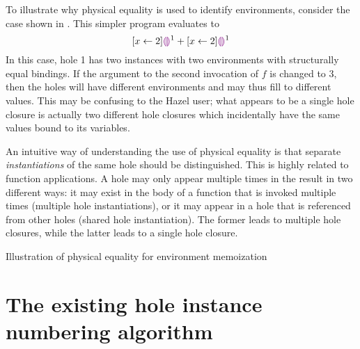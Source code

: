 To illustrate why physical equality is used to identify environments, consider the case shown in . This simpler program evaluates to \[
  [x\leftarrow 2]\textcolor{violet}{\llparenthesis}\textcolor{violet}{\rrparenthesis}^1 + [x\leftarrow 2]\textcolor{violet}{\llparenthesis}\textcolor{violet}{\rrparenthesis}^1
\] In this case, hole 1 has two instances with two environments with structurally equal bindings. If the argument to the second invocation of $f$ is changed to $3$, then the holes will have different environments and may thus fill to different values. This may be confusing to the Hazel user; what appears to be a single hole closure is actually two different hole closures which incidentally have the same values bound to its variables.

An intuitive way of understanding the use of physical equality is that separate \textit{instantiations} of the same hole should be distinguished. This is highly related to function applications. A hole may only appear multiple times in the result in two different ways: it may exist in the body of a function that is invoked multiple times (multiple hole instantiations), or it may appear in a hole that is referenced from other holes (shared hole instantiation). The former leads to multiple hole closures, while the latter leads to a single hole closure.

\begin{listing}
  \caption{Illustration of physical equality for environment memoization}
  \label{fig:physical-equality-illustration}
\end{listing}

\section{The existing hole instance numbering algorithm}
\label{sec:existing-hole-numbering}

